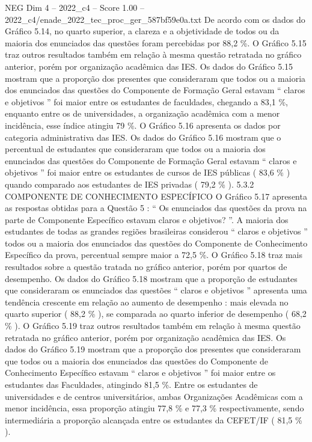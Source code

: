 \begin{textsample}{NEG Dim 4 – 2022\_c4 – Score 1.00 – 2022\_c4/enade\_2022\_tec\_proc\_ger\_587bf59e0a.txt}
De acordo com os dados do Gráfico 5.14, no quarto superior, a clareza e a objetividade de todos ou da maioria dos enunciados das questões foram percebidas por 88,2 \%.
O Gráfico 5.15 traz outros resultados também em relação à mesma questão retratada no gráfico anterior, porém por organização acadêmica das IES.
Os dados do Gráfico 5.15 mostram que a proporção dos presentes que consideraram que todos ou a maioria dos enunciados das questões do Componente de Formação Geral estavam “ claros e objetivos ” foi maior entre os estudantes de faculdades, chegando a 83,1 \%, enquanto entre os de universidades, a organização acadêmica com a menor incidência, esse índice atingiu 79 \%.
O Gráfico 5.16 apresenta os dados por categoria administrativa das IES.
Os dados do Gráfico 5.16 mostram que o percentual de estudantes que consideraram que todos ou a maioria dos enunciados das questões do Componente de Formação Geral estavam “ claros e objetivos ” foi maior entre os estudantes de cursos de IES públicas ( 83,6 \% ) quando comparado aos estudantes de IES privadas ( 79,2 \% ). 5.3.2 COMPONENTE DE CONHECIMENTO ESPECÍFICO O Gráfico 5.17 apresenta as respostas obtidas para a Questão 5 : “ Os enunciados das questões da prova na parte de Componente Específico estavam claros e objetivos? ”.
A maioria dos estudantes de todas as grandes regiões brasileiras considerou “ claros e objetivos ” todos ou a maioria dos enunciados das questões do Componente de Conhecimento Específico da prova, percentual sempre maior a 72,5 \%.
O Gráfico 5.18 traz mais resultados sobre a questão tratada no gráfico anterior, porém por quartos de desempenho.
Os dados do Gráfico 5.18 mostram que a proporção de estudantes que consideraram os enunciados das questões “ claros e objetivos ” apresenta uma tendência crescente em relação ao aumento de desempenho : mais elevada no quarto superior ( 88,2 \% ), se comparada ao quarto inferior de desempenho ( 68,2 \% ).
O Gráfico 5.19 traz outros resultados também em relação à mesma questão retratada no gráfico anterior, porém por organização acadêmica das IES.
Os dados do Gráfico 5.19 mostram que a proporção dos presentes que consideraram que todos ou a maioria dos enunciados das questões do Componente de Conhecimento Específico estavam “ claros e objetivos ” foi maior entre os estudantes das Faculdades, atingindo 81,5 \%.
Entre os estudantes de universidades e de centros universitários, ambas Organizações Acadêmicas com a menor incidência, essa proporção atingiu 77,8 \% e 77,3 \% respectivamente, sendo intermediária a proporção alcançada entre os estudantes da CEFET/IF ( 81,5 \% ).

\end{textsample}
